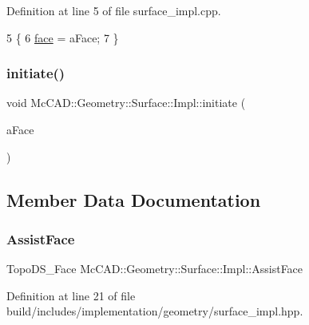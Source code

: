 Definition at line 5 of file surface\+\_\+impl.\+cpp.


\begin{DoxyCode}
5                                                           \{
6   \hyperlink{classMcCAD_1_1Geometry_1_1Surface_1_1Impl_abf7c4dc859404ce42b425c7d6b578f69}{face} = aFace;
7 \}
\end{DoxyCode}
\mbox{\label{classMcCAD_1_1Geometry_1_1Surface_1_1Impl_ac86d81ec667089a969dcb10b996d7233}} 
\subsubsection{\texorpdfstring{initiate()}{initiate()}\hspace{0.1cm}{\footnotesize\ttfamily [2/2]}}
{\footnotesize\ttfamily void Mc\+C\+A\+D\+::\+Geometry\+::\+Surface\+::\+Impl\+::initiate (\begin{DoxyParamCaption}\item[{const Topo\+D\+S\+\_\+\+Face \&}]{a\+Face }\end{DoxyParamCaption})}



\subsection{Member Data Documentation}
\mbox{\label{classMcCAD_1_1Geometry_1_1Surface_1_1Impl_aea34d548cf117c767c27247dfb8da345}} 
\subsubsection{\texorpdfstring{Assist\+Face}{AssistFace}}
{\footnotesize\ttfamily Topo\+D\+S\+\_\+\+Face Mc\+C\+A\+D\+::\+Geometry\+::\+Surface\+::\+Impl\+::\+Assist\+Face}



Definition at line 21 of file build/includes/implementation/geometry/surface\+\_\+impl.\+hpp.

